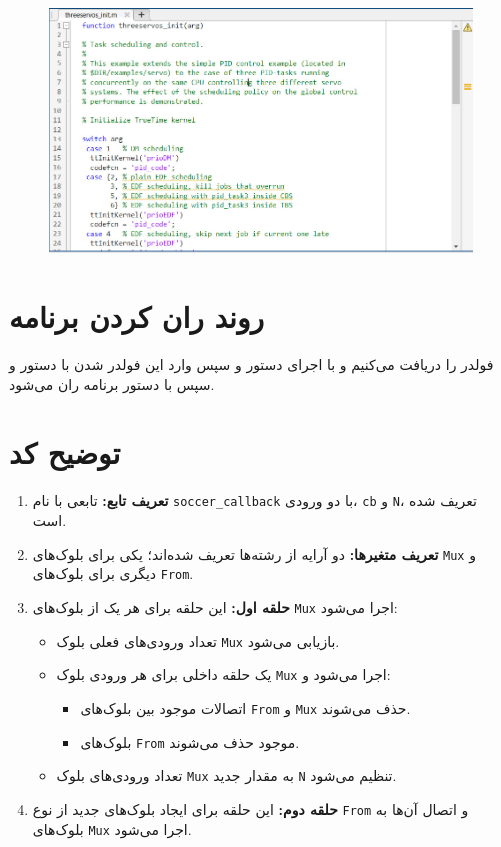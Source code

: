 \begin{figure}[H]
	\centering
	\includegraphics{16.jpg}
	\label{fig:label4}
\end{figure}

\newpage

\section*{روند ران کردن برنامه}

فولدر
را دریافت می‌کنیم و با اجرای دستور
و سپس وارد این فولدر شدن با دستور
و سپس با دستور
برنامه ران می‌شود.

\section*{توضیح کد}

\begin{enumerate}
	\item \textbf{تعریف تابع:} تابعی با نام \texttt{soccer\_callback} با دو ورودی، \texttt{cb} و \texttt{N}، تعریف شده است.
	\item \textbf{تعریف متغیر‌ها:} دو آرایه از رشته‌ها تعریف شده‌اند؛ یکی برای بلوک‌های \texttt{Mux} و دیگری برای بلوک‌های \texttt{From}.
	\item \textbf{حلقه اول:} این حلقه برای هر یک از بلوک‌های \texttt{Mux} اجرا می‌شود:
	\begin{itemize}
		\item تعداد ورودی‌های فعلی بلوک \texttt{Mux} بازیابی می‌شود.
		\item یک حلقه داخلی برای هر ورودی بلوک \texttt{Mux} اجرا می‌شود و:
		\begin{itemize}
			\item اتصالات موجود بین بلوک‌های \texttt{From} و \texttt{Mux} حذف می‌شوند.
			\item بلوک‌های \texttt{From} موجود حذف می‌شوند.
		\end{itemize}
		\item تعداد ورودی‌های بلوک \texttt{Mux} به مقدار جدید \texttt{N} تنظیم می‌شود.
	\end{itemize}
	\item \textbf{حلقه دوم:} این حلقه برای ایجاد بلوک‌های جدید از نوع \texttt{From} و اتصال آن‌ها به بلوک‌های \texttt{Mux} اجرا می‌شود.
\end{enumerate}

